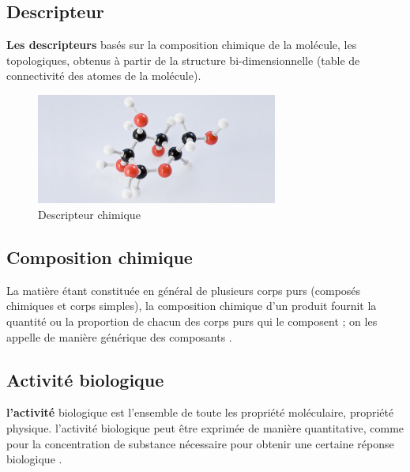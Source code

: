 \documentclass[12pt]{report}
\begin{document}
\subsection{Descripteur}
\textbf{Les descripteurs} basés sur la composition chimique de la molécule, les topologiques, obtenus à partir de la structure bi-dimensionnelle (table de connectivité des atomes de la molécule).
\\
\begin{figure}[h]
\begin{center}
\includegraphics[width=300]{des.jpg}
\caption{Descripteur chimique}
\end{center}
\end{figure}
\subsection{Composition chimique}
La matière étant constituée en général de plusieurs corps purs (composés chimiques et corps simples), la composition chimique d'un produit fournit la quantité ou la proportion de chacun des corps purs qui le composent ; on les appelle de manière générique des composants \cite{ref9}.

\subsection{Activité biologique}
\textbf{l'activité} biologique est l'ensemble de toute les propriété moléculaire, propriété physique. l'activité biologique peut être exprimée de manière quantitative, comme pour la concentration de substance nécessaire pour obtenir une certaine réponse biologique \cite{ref9} .
\end{document}
